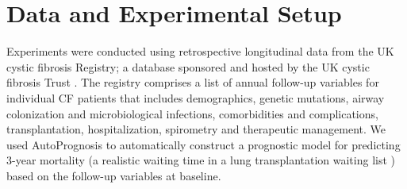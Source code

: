 \documentclass [PhD] {uclathes}
\begin{document}
\section{Data and Experimental Setup}
\label{ch6sec1}
Experiments were conducted using retrospective longitudinal data from the UK cystic fibrosis Registry; a database sponsored and hosted by the UK cystic fibrosis Trust \cite{CFReg}. The registry comprises a list of annual follow-up variables for individual CF patients that includes demographics, genetic mutations, airway colonization and microbiological infections, comorbidities and complications, transplantation, hospitalization, spirometry and therapeutic management. We used AutoPrognosis to automatically construct a prognostic model for predicting 3-year mortality (a realistic waiting time in a lung transplantation waiting list \cite{mayer2002developing}) based on the follow-up variables at baseline. 
\end{document}
